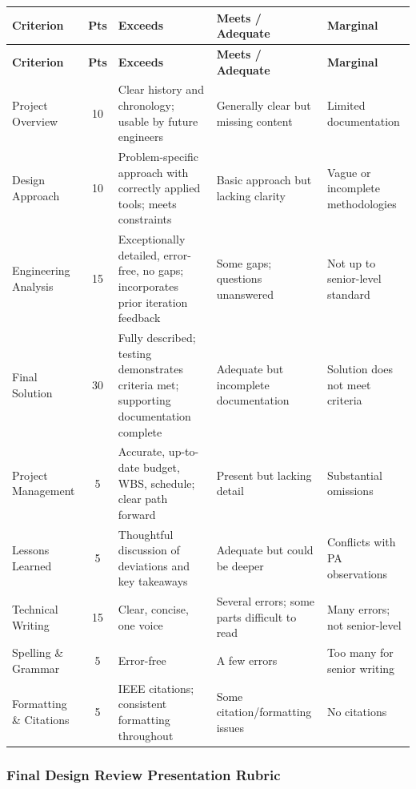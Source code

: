 {\small
\begin{longtable}{p{3.2cm} c p{3.5cm} p{3.5cm} p{2.8cm}}
\toprule
\textbf{Criterion} & \textbf{Pts} & \textbf{Exceeds} & \textbf{Meets / Adequate} & \textbf{Marginal} \\
\midrule
\endfirsthead
\toprule
\textbf{Criterion} & \textbf{Pts} & \textbf{Exceeds} & \textbf{Meets / Adequate} & \textbf{Marginal} \\
\midrule
\endhead
\bottomrule
\endfoot

Project Overview & 10 & Clear history and chronology; usable by future engineers & Generally clear but missing content & Limited documentation \\
\addlinespace
Design Approach & 10 & Problem-specific approach with correctly applied tools; meets constraints & Basic approach but lacking clarity & Vague or incomplete methodologies \\
\addlinespace
Engineering Analysis & 15 & Exceptionally detailed, error-free, no gaps; incorporates prior iteration feedback & Some gaps; questions unanswered & Not up to senior-level standard \\
\addlinespace
Final Solution & 30 & Fully described; testing demonstrates criteria met; supporting documentation complete & Adequate but incomplete documentation & Solution does not meet criteria \\
\addlinespace
Project Management & 5 & Accurate, up-to-date budget, WBS, schedule; clear path forward & Present but lacking detail & Substantial omissions \\
\addlinespace
Lessons Learned & 5 & Thoughtful discussion of deviations and key takeaways & Adequate but could be deeper & Conflicts with PA observations \\
\addlinespace
Technical Writing & 15 & Clear, concise, one voice & Several errors; some parts difficult to read & Many errors; not senior-level \\
\addlinespace
Spelling \& Grammar & 5 & Error-free & A few errors & Too many for senior writing \\
\addlinespace
Formatting \& Citations & 5 & IEEE citations; consistent formatting throughout & Some citation/formatting issues & No citations \\

\end{longtable}
}

\subsubsection{Final Design Review Presentation Rubric}
\label{sssec:rubric-fdr-pres}

